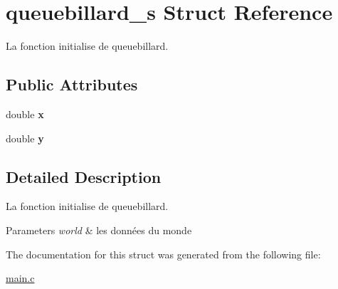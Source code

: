 \hypertarget{structqueuebillard__s}{\section{queuebillard\-\_\-s Struct Reference}
\label{structqueuebillard__s}
}


La fonction initialise de queuebillard.  


\subsection*{Public Attributes}
\begin{DoxyCompactItemize}
\item 
\hypertarget{structqueuebillard__s_a7ae2cd7e911ee7fa820d39f84bd80477}{double {\bfseries x}}\label{structqueuebillard__s_a7ae2cd7e911ee7fa820d39f84bd80477}

\item 
\hypertarget{structqueuebillard__s_a2f6b5be66113651b8b85b43ba1708e2b}{double {\bfseries y}}\label{structqueuebillard__s_a2f6b5be66113651b8b85b43ba1708e2b}

\end{DoxyCompactItemize}


\subsection{Detailed Description}
La fonction initialise de queuebillard. 


\begin{DoxyParams}{Parameters}
{\em world} & les données du monde \\
\hline
\end{DoxyParams}


The documentation for this struct was generated from the following file\-:\begin{DoxyCompactItemize}
\item 
\hyperlink{main_8c}{main.\-c}\end{DoxyCompactItemize}
